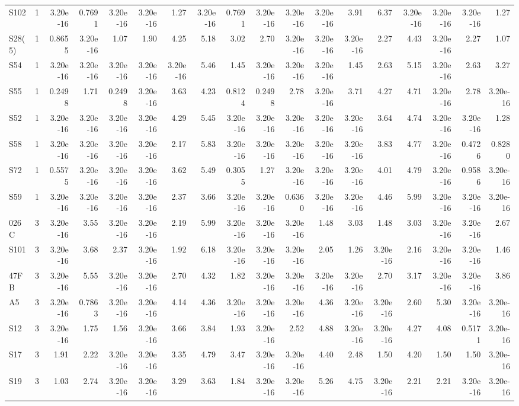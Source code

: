 {\begin{longtable}{lrrrrrrrrrrrrrrrrr}
  S102 & 1 & 3.20e-16 & 0.7691 & 3.20e-16 & 3.20e-16 & 1.27 & 3.20e-16 & 0.7691 & 3.20e-16 & 3.20e-16 & 3.20e-16 & 3.91 & 6.37 & 3.20e-16 & 3.20e-16 & 3.20e-16 & 1.27 \\
  S28(5) & 1 & 0.8655 & 3.20e-16 & 1.07 & 1.90 & 4.25 & 5.18 & 3.02 & 2.70 & 3.20e-16 & 3.20e-16 & 3.20e-16 & 2.27 & 4.43 & 3.20e-16 & 2.27 & 1.07 \\
  S54 & 1 & 3.20e-16 & 3.20e-16 & 3.20e-16 & 3.20e-16 & 3.20e-16 & 5.46 & 1.45 & 3.20e-16 & 3.20e-16 & 3.20e-16 & 1.45 & 2.63 & 5.15 & 3.20e-16 & 2.63 & 3.27 \\
  S55 & 1 & 0.2498 & 1.71 & 0.2498 & 3.20e-16 & 3.63 & 4.23 & 0.8124 & 0.2498 & 2.78 & 3.20e-16 & 3.71 & 4.27 & 4.71 & 3.20e-16 & 2.78 & 3.20e-16 \\
  S52 & 1 & 3.20e-16 & 3.20e-16 & 3.20e-16 & 3.20e-16 & 4.29 & 5.45 & 3.20e-16 & 3.20e-16 & 3.20e-16 & 3.20e-16 & 3.20e-16 & 3.64 & 4.74 & 3.20e-16 & 3.20e-16 & 1.28 \\
  S58 & 1 & 3.20e-16 & 3.20e-16 & 3.20e-16 & 3.20e-16 & 2.17 & 5.83 & 3.20e-16 & 3.20e-16 & 3.20e-16 & 3.20e-16 & 3.20e-16 & 3.83 & 4.77 & 3.20e-16 & 0.4726 & 0.8280 \\
  S72 & 1 & 0.5575 & 3.20e-16 & 3.20e-16 & 3.20e-16 & 3.62 & 5.49 & 0.3055 & 1.27 & 3.20e-16 & 3.20e-16 & 3.20e-16 & 4.01 & 4.79 & 3.20e-16 & 0.9586 & 3.20e-16 \\
  S59 & 1 & 3.20e-16 & 3.20e-16 & 3.20e-16 & 3.20e-16 & 2.37 & 3.66 & 3.20e-16 & 3.20e-16 & 0.6360 & 3.20e-16 & 3.20e-16 & 4.46 & 5.99 & 3.20e-16 & 3.20e-16 & 3.20e-16 \\
  026C & 3 & 3.20e-16 & 3.55 & 3.20e-16 & 3.20e-16 & 2.19 & 5.99 & 3.20e-16 & 3.20e-16 & 3.20e-16 & 1.48 & 3.03 & 1.48 & 3.03 & 3.20e-16 & 3.20e-16 & 2.67 \\
  S101 & 3 & 3.20e-16 & 3.68 & 2.37 & 3.20e-16 & 1.92 & 6.18 & 3.20e-16 & 3.20e-16 & 3.20e-16 & 2.05 & 1.26 & 3.20e-16 & 2.16 & 3.20e-16 & 3.20e-16 & 1.46 \\
  47FB & 3 & 3.20e-16 & 5.55 & 3.20e-16 & 3.20e-16 & 2.70 & 4.32 & 1.82 & 3.20e-16 & 3.20e-16 & 3.20e-16 & 3.20e-16 & 2.70 & 3.17 & 3.20e-16 & 3.20e-16 & 3.86 \\
  A5 & 3 & 3.20e-16 & 0.7863 & 3.20e-16 & 3.20e-16 & 4.14 & 4.36 & 3.20e-16 & 3.20e-16 & 3.20e-16 & 4.36 & 3.20e-16 & 3.20e-16 & 2.60 & 5.30 & 3.20e-16 & 3.20e-16 \\
  S12 & 3 & 3.20e-16 & 1.75 & 1.56 & 3.20e-16 & 3.66 & 3.84 & 1.93 & 3.20e-16 & 2.52 & 4.88 & 3.20e-16 & 3.20e-16 & 4.27 & 4.08 & 0.5171 & 3.20e-16 \\
  S17 & 3 & 1.91 & 2.22 & 3.20e-16 & 3.20e-16 & 3.35 & 4.79 & 3.47 & 3.20e-16 & 3.20e-16 & 4.40 & 2.48 & 1.50 & 4.20 & 1.50 & 1.50 & 3.20e-16 \\
  S19 & 3 & 1.03 & 2.74 & 3.20e-16 & 3.20e-16 & 3.29 & 3.63 & 1.84 & 3.20e-16 & 3.20e-16 & 5.26 & 4.75 & 3.20e-16 & 2.21 & 2.21 & 3.20e-16 & 3.20e-16 \\
\end{longtable}
}
